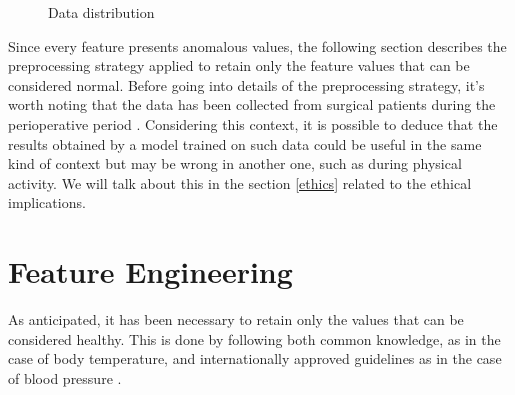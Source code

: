 \documentclass{article}
\begin{document}
\begin{multicols*}{2}
\begin{figure}[H]
			\centering
			\caption{Data distribution}
\end{figure}
Since every feature presents anomalous values, the following section describes the preprocessing strategy applied to retain only the feature values that can be considered normal.
Before going into details of the preprocessing strategy, it's worth noting that the data has been collected from surgical patients during the perioperative period \cite{VitalDB}. Considering this context, it is possible to deduce that the results obtained by a model trained on such data could be useful in the same kind of context but may be wrong in another one, such as during physical activity. We will talk about this in the section \ref{ethics} related to the ethical implications.

\section{Feature Engineering}
		\label{preprocessing}
As anticipated, it has been necessary to retain only the values that can be considered healthy. This is done by following both common knowledge, as in the case of body temperature, and internationally approved guidelines as in the case of blood pressure \cite{ESC}.



\end{multicols*}
\end{document}
